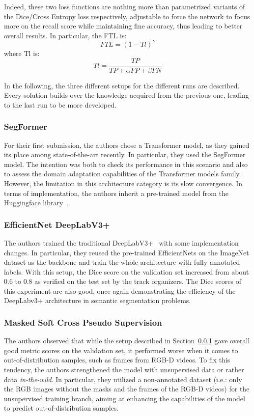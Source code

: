 \documentclass[twocolumn]{article}
\begin{document}
Indeed, these two loss functions are nothing more than parametrized variants of the Dice/Cross Entropy loss respectively, adjustable to force the network to focus more on the recall score while maintaining fine accuracy, thus leading to better overall results. In particular, the FTL is: 
\begin{equation}
    FTL = (1 - Tl)^\gamma
\end{equation}
where Tl is:
\begin{equation}
    Tl = \frac{TP}{TP + \alpha FP + \beta FN}
\end{equation}

In the following, the three different setups for the different runs are described. Every solution builds over the knowledge acquired from the previous one, leading to the last run to be more developed.

\subsubsection{SegFormer}
\label{sec:segFormer}
For their first submission, the authors chose a Transformer model, as they gained its place among state-of-the-art recently. In particular, they used the SegFormer~\cite{xie2021segformer} model. The intention was both to check its performance in this scenario and also to assess the domain adaptation capabilities of the Transformer models family. However, the limitation in this architecture category is its slow convergence. In terms of implementation, the authors inherit a pre-trained model from the Huggingface library~\cite{huggingface}. 

\subsubsection{EfficientNet DeepLabV3+}
The authors trained the traditional DeepLabV3+~\cite{chen2018encoder} with some implementation changes. In particular, they reused the pre-trained EfficientNets \cite{tan2019efficientnet} on the ImageNet dataset as the backbone and train the whole architecture with fully-annotated labels. With this setup, the Dice score on the validation set increased from about 0.6 to 0.8 as verified on the test set by the track organizers. The Dice scores of this experiment are also good, once again demonstrating the efficiency of the DeepLabv3+ architecture in semantic segmentation problems.

\subsubsection{Masked Soft Cross Pseudo Supervision}
\label{sec:mscps}
The authors observed that while the setup described in Section~\ref{sec:segFormer} gave overall good metric scores on the validation set, it performed worse when it comes to out-of-distribution samples, such as frames from RGB-D videos. To fix this tendency, the authors strengthened the model with unsupervised data or rather data \emph{in-the-wild}. In particular, they utilized a non-annotated dataset (i.e.: only the RGB images without the masks and the frames of the RGB-D videos) for the unsupervised training branch, aiming at enhancing the capabilities of the model to predict out-of-distribution samples. 
\end{document}
